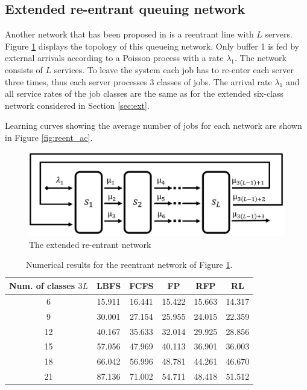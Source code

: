 \documentclass[11pt]{article}
\theoremstyle{definition}
\numberwithin{equation}{section}
\begin{document}
\subsection{Extended re-entrant queuing network}


Another network that has been proposed in \cite{Bertsimas2015} is a reentrant line with $L$ servers. Figure \ref{fig2} displays the
topology of this queueing network. Only buffer 1 is fed by external arrivals according to a Poisson process with a rate $\lambda_1$. The network consists of $L$ services. To leave the system each job has to re-enter each server three times, thus each server processes 3 classes of jobs. The arrival rate $\lambda_1$ and all service rates of the job classes are the same as for the extended
six-class network considered in Section \ref{sec:ext}.

Learning curves showing the average number of jobs for each network are shown in Figure \ref{fig:reent_ac}.

\begin{figure}[H]
\centering%
\includegraphics[width=.8\linewidth]{Paper_reentr.JPG}
\caption[]{The extended re-entrant network}
\label{fig2}%
\end{figure}

\begin{table}[H]
\centering%
\begin{tabular}{|c|c|c|c|c|c|}
  \hline
  Num. of classes $3L$  & LBFS & FCFS & FP & RFP & RL\\\hline
  6 & 15.911 & 16.441 & 15.422 & 15.663 & 14.317\\\hline
  9 & 30.001 & 27.154 & 25.955 & 24.015& 22.359 \\\hline
  12  & 40.167 & 35.633 & 32.014 & 29.925& 28.856\\\hline
  15  & 57.056  & 47.969  & 40.113 & 36.901& 36.003\\\hline
  18  & 66.042 & 56.996 & 48.781  & 44.261  & 46.670\\\hline
  21  & 87.136 & 71.002 & 54.711 & 48.418 & 51.512\\
  \hline
\end{tabular}
\caption[]{Numerical results for the reentrant network of Figure \ref{fig2}.}\label{tabReentr}%
\end{table}
\end{document}
